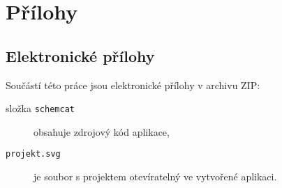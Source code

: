 \documentclass[12pt,a4paper]{report}
\newif\iffinal
\let\openright=\clearpage
\begin{document}
\iffinal
  

  \tableofcontents

  
  
  
  
  
  

  

  \listoffigures

  \listoftables
\else

  
  \tableofcontents
  
  
  
  
  
  
  
  \listoffigures
  \listoftables

\fi



\appendix
\chapter{Přílohy}

\section{Elektronické přílohy}\label{appendix:electronic}
Součástí této práce jsou elektronické přílohy v archivu ZIP:
\begin{description}
  \item[složka \texttt{schemcat}] obsahuje zdrojový kód aplikace,
  \item[\texttt{projekt.svg}] je soubor s projektem otevíratelný ve vytvořené aplikaci.
\end{description}

\openright
\end{document}
